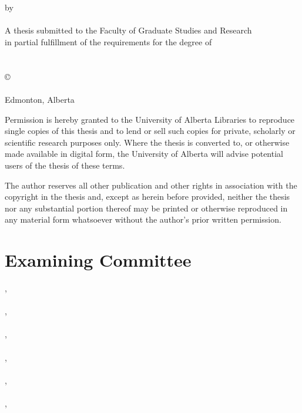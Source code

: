 
  \begin{center}
    \Large{\textbf{\school}}  \\ [.6in]
    \Large{\textbf{\thesistitle}} \\ [.1in]
    \normalsize{by} \\ [.1in]
    \Large{\textbf{\name}}  \\ [.6in]
    \normalsize{A thesis submitted to the Faculty of Graduate Studies and Research \\
    in partial fulfillment of the requirements for the degree of} \\ [0.1in]
    \Large{\textbf{\program}} \\ [.1in]
    \normalsize{\dept} \\ [0.6in]
    \scriptsize{\copyright\:\name} \\
    \scriptsize{\semester} \\
    \scriptsize{Edmonton, Alberta} \\ [0.6in]
    \scriptsize{Permission is hereby granted to the University of Alberta Libraries to reproduce single copies of this thesis and to lend or sell such copies for private, scholarly or scientific research purposes only. Where the thesis is converted to, or otherwise made available in digital form, the University of Alberta will advise potential users of the thesis of these terms.

The author reserves all other publication and other rights in association with the copyright in the thesis and, except as herein before provided, neither the thesis nor any substantial portion thereof may be printed or otherwise reproduced in any material form whatsoever without the author's prior written permission.}
  \end{center}

  \newpage
  \chapter*{Examining Committee}
  \thispagestyle{empty}
     \supervisor, \; \superloc \\ \\
     \coma, \; \loca \\ \\
     \comb, \; \locb \\ \\
     \comc, \; \locc \\ \\
     \comd, \; \locd \\ \\
     \come, \; \loce


